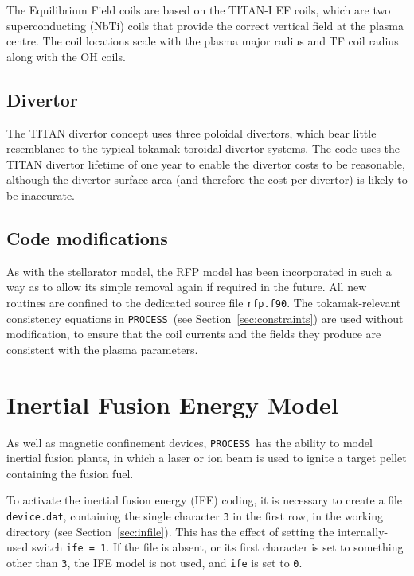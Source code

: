 \documentclass[11pt,a4paper]{report}
\newcommand{\process}{\mbox{\texttt{PROCESS}}}
\begin{document}
The Equilibrium Field coils are based on the TITAN-I EF coils, which are two
superconducting (NbTi) coils that provide the correct vertical field at the
plasma centre. The coil locations scale with the plasma major radius and TF
coil radius along with the OH coils.

\subsection{Divertor}

The TITAN divertor concept uses three poloidal divertors, which bear little
resemblance to the typical tokamak toroidal divertor systems. The code uses
the TITAN divertor lifetime of one year to enable the divertor costs to be
reasonable, although the divertor surface area (and therefore the cost per
divertor) is likely to be inaccurate.

\subsection{Code modifications}

As with the stellarator model, the RFP model has been incorporated in such a
way as to allow its simple removal again if required in the future. All new
routines are confined to the dedicated source file \texttt{rfp.f90}. The
tokamak-relevant consistency equations in \process\ (see
Section~\ref{sec:constraints}) are used without modification, to ensure that
the coil currents and the fields they produce are consistent with the plasma
parameters.

\section{Inertial Fusion Energy Model}
\label{sec:ife}

As well as magnetic confinement devices, \process\ has the ability to model
inertial fusion plants, in which a laser or ion beam is used to ignite a
target pellet containing the fusion fuel.

To activate the inertial fusion energy (IFE) coding, it is necessary to create
a file \texttt{device.dat}, containing the single character \texttt{3} in the
first row, in the working directory (see Section~\ref{sec:infile}). This has
the effect of setting the internally-used switch \texttt{ife = 1}. If the file
is absent, or its first character is set to something other than \texttt{3},
the IFE model is not used, and \texttt{ife} is set to \texttt{0}.
\end{document}
